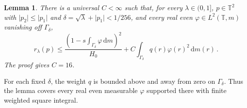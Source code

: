 \documentclass[11pt]{amsart}
\theoremstyle{plain}
\newtheorem{lemma}[theorem]{Lemma}
\theoremstyle{definition}
\newcommand{\T}{\mathbb T}
\newcommand{\1}{\mathbf 1}
\newcommand{\abs}[1]{\lvert #1\rvert}
\newcommand{\dd}{\,\mathrm d}
\begin{document}
\begin{lemma}\label{lem:effective-energy}
There is a universal $C<\infty$ such that, for every
$\lambda\in(0,1]$, $p\in\T^2$ with
$\abs{p_2}\leq\abs{p_1}$ and
$\delta=\sqrt\lambda+\abs{p_1}<1/256$, and every real even
$\varphi\in L^2(\T,m)$ vanishing off $\Gamma_\delta$,
\begin{equation}\label{eq:effective-energy}
  r_\lambda(p)\leq
  \frac{\left(1-s\int_{\Gamma_\delta}\varphi\dd m\right)^2}{H_0}
  +C\int_{\Gamma_\delta}q(r)\varphi(r)^2\dd m(r)\, .
\end{equation}
The proof gives $C=16$.
\end{lemma}

For each fixed $\delta$, the weight $q$ is bounded above and away from
zero on $\Gamma_\delta$.  Thus the lemma covers every real even measurable
$\varphi$ supported there with finite weighted square integral.
\end{document}
